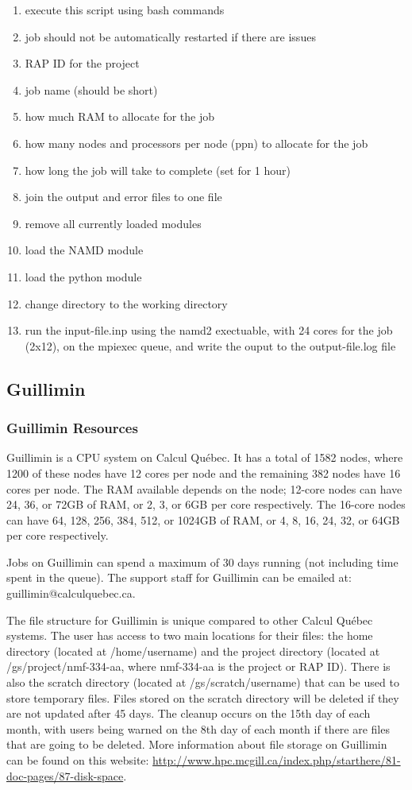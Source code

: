 \documentclass[12pt]{article}
\begin{document}
\begin{enumerate}
\item execute this script using bash commands
\item job should not be automatically restarted if there are issues
\item RAP ID for the project
\item job name (should be short)
\item how much RAM to allocate for the job
\item how many nodes and processors per node (ppn) to allocate for the job
\item how long the job will take to complete (set for 1 hour)
\item join the output and error files to one file
\item remove all currently loaded modules
\item load the NAMD module
\item load the python module
\item change directory to the working directory
\item run the input-file.inp using the namd2 exectuable, with 24 cores for the job (2x12), on the mpiexec queue, and write the ouput to the output-file.log file
\end{enumerate}

\subsection{Guillimin}
\subsubsection{Guillimin Resources}

\quad Guillimin is a CPU system on Calcul Qu\'{e}bec. It has a total of 1582 nodes, where 1200 of these nodes have 12 cores per node and the remaining 382 nodes have 16 cores per node. The RAM available depends on the node; 12-core nodes can have 24, 36, or 72GB of RAM, or 2, 3, or 6GB per core respectively. The 16-core nodes can have 64, 128, 256, 384, 512, or 1024GB of RAM, or 4, 8, 16, 24, 32, or 64GB per core respectively.

\quad Jobs on Guillimin can spend a maximum of 30 days running (not including time spent in the queue). The support staff for Guillimin can be emailed at: guillimin@calculquebec.ca.

\quad The file structure for Guillimin is unique compared to other Calcul Qu\'{e}bec systems. The user has access to two main locations for their files: the home directory (located at /home/username) and the project directory (located at /gs/project/nmf-334-aa, where nmf-334-aa is the project or RAP ID). There is also the scratch directory (located at /gs/scratch/username) that can be used to store temporary files. Files stored on the scratch directory will be deleted if they are not updated after 45 days. The cleanup occurs on the 15th day of each month, with users being warned on the 8th day of each month if there are files that are going to be deleted. More information about file storage on Guillimin can be found on this website: \url{http://www.hpc.mcgill.ca/index.php/starthere/81-doc-pages/87-disk-space}.
\end{document}

